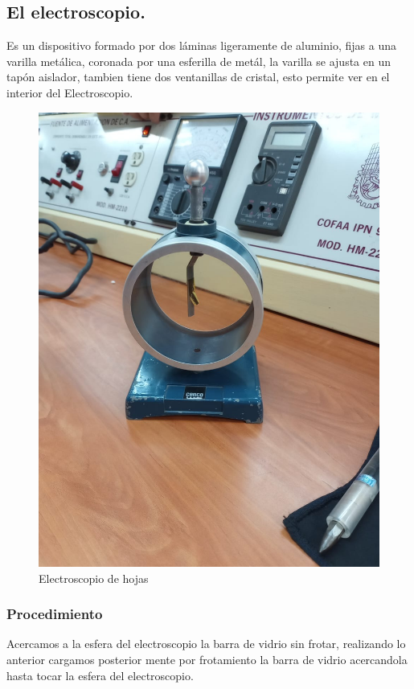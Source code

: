 \documentclass[10pt]{article}
\begin{document}
\begin{multicols}{2}
\subsection{El electroscopio.}
Es un dispositivo formado por dos láminas ligeramente de aluminio, fijas a una varilla metálica, coronada por una esferilla de metál, la varilla se ajusta en un tapón aislador, tambien tiene dos ventanillas de cristal, esto permite ver en el interior del Electroscopio.

\begin{figure}[h]
\centering
\includegraphics[scale=0.07]{p1}
\caption{Electroscopio de hojas}
\end{figure}

\subsubsection*{Procedimiento}
Acercamos a la esfera del electroscopio la barra de vidrio sin frotar, realizando lo anterior cargamos posterior mente por frotamiento la barra de vidrio acercandola hasta tocar la esfera del electroscopio.


\end{multicols}
\end{document}
